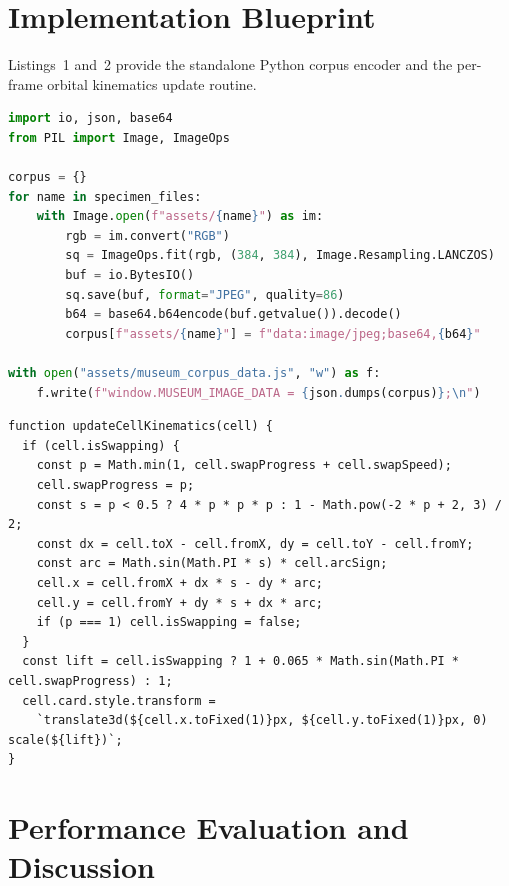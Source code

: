 \documentclass[journal,compsoc]{IEEEtran}
\begin{document}
\section{Implementation Blueprint}
Listings~1 and~2 provide the standalone Python corpus encoder and the per-frame orbital kinematics update routine.

\begin{lstlisting}[language=Python,caption={Standalone Python Corpus Encoder (\texttt{build\_corpus.py}).}]
import io, json, base64
from PIL import Image, ImageOps

corpus = {}
for name in specimen_files:
    with Image.open(f"assets/{name}") as im:
        rgb = im.convert("RGB")
        sq = ImageOps.fit(rgb, (384, 384), Image.Resampling.LANCZOS)
        buf = io.BytesIO()
        sq.save(buf, format="JPEG", quality=86)
        b64 = base64.b64encode(buf.getvalue()).decode()
        corpus[f"assets/{name}"] = f"data:image/jpeg;base64,{b64}"

with open("assets/museum_corpus_data.js", "w") as f:
    f.write(f"window.MUSEUM_IMAGE_DATA = {json.dumps(corpus)};\n")
\end{lstlisting}

\begin{lstlisting}[caption={Planar Orbital Kinematics (\texttt{choreography.js}).}]
function updateCellKinematics(cell) {
  if (cell.isSwapping) {
    const p = Math.min(1, cell.swapProgress + cell.swapSpeed);
    cell.swapProgress = p;
    const s = p < 0.5 ? 4 * p * p * p : 1 - Math.pow(-2 * p + 2, 3) / 2;
    const dx = cell.toX - cell.fromX, dy = cell.toY - cell.fromY;
    const arc = Math.sin(Math.PI * s) * cell.arcSign;
    cell.x = cell.fromX + dx * s - dy * arc;
    cell.y = cell.fromY + dy * s + dx * arc;
    if (p === 1) cell.isSwapping = false;
  }
  const lift = cell.isSwapping ? 1 + 0.065 * Math.sin(Math.PI * cell.swapProgress) : 1;
  cell.card.style.transform =
    `translate3d(${cell.x.toFixed(1)}px, ${cell.y.toFixed(1)}px, 0) scale(${lift})`;
}
\end{lstlisting}

\section{Performance Evaluation and Discussion}
\end{document}
